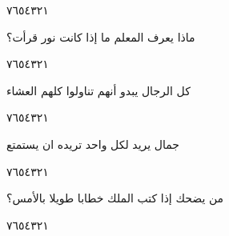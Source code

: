 \documentclass[11pt, a4paper]{article}
\begin{document}
{\begin{center}
        \hfill\textarabic{٧}\hfill\textarabic{٦}\hfill\textarabic{٥}\hfill\textarabic{٤}\hfill\textarabic{٣}\hfill\textarabic{٢}\hfill\textarabic{١}
        \end{center}


\vspace{0.5\baselineskip}\begin{flushright}
\textarabic{ماذا يعرف المعلم ما إذا كانت نور قرأت؟}
\end{flushright}

\begin{center}
        \hfill\textarabic{٧}\hfill\textarabic{٦}\hfill\textarabic{٥}\hfill\textarabic{٤}\hfill\textarabic{٣}\hfill\textarabic{٢}\hfill\textarabic{١}
        \end{center}


\vspace{0.5\baselineskip}\begin{flushright}
\textarabic{كل الرجال يبدو أنهم تناولوا كلهم العشاء}
\end{flushright}

\begin{center}
        \hfill\textarabic{٧}\hfill\textarabic{٦}\hfill\textarabic{٥}\hfill\textarabic{٤}\hfill\textarabic{٣}\hfill\textarabic{٢}\hfill\textarabic{١}
        \end{center}


\vspace{0.5\baselineskip}\begin{flushright}
\textarabic{جمال يريد لكل واحد تريده ان يستمتع}
\end{flushright}

\begin{center}
        \hfill\textarabic{٧}\hfill\textarabic{٦}\hfill\textarabic{٥}\hfill\textarabic{٤}\hfill\textarabic{٣}\hfill\textarabic{٢}\hfill\textarabic{١}
        \end{center}


\vspace{0.5\baselineskip}\begin{flushright}
\textarabic{من يضحك إذا كتب الملك خطابا طويلا بالأمس؟}
\end{flushright}

\begin{center}
        \hfill\textarabic{٧}\hfill\textarabic{٦}\hfill\textarabic{٥}\hfill\textarabic{٤}\hfill\textarabic{٣}\hfill\textarabic{٢}\hfill\textarabic{١}
        \end{center}


}
\end{document}

